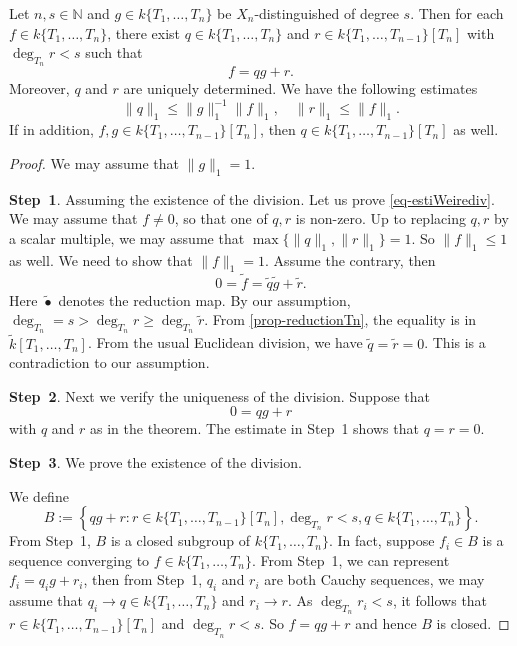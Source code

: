 \begin{thm}\label{thm-Weierstrassdivision}
    Let $n,s\in \mathbb{N}$ and $g\in k\{T_1,\ldots,T_n\}$ be $X_n$-distinguished of degree $s$. Then for each $f\in k\{T_1,\ldots,T_n\}$, there exist $q\in k\{T_1,\ldots,T_n\}$ and $r\in k\{T_1,\ldots,T_{n-1}\}[T_n]$ with $\deg_{T_n}r<s$ such that 
    \[
        f=qg+r.
    \]
    Moreover, $q$ and $r$ are uniquely determined. We have the following estimates
    \begin{equation}\label{eq-estiWeirediv}
        \|q\|_1\leq \|g\|_1^{-1}\|f\|_1,\quad \|r\|_1\leq \|f\|_1.   
    \end{equation}
    If in addition, $f,g\in k\{T_1,\ldots,T_{n-1}\}[T_n]$, then $q\in k\{T_1,\ldots,T_{n-1}\}[T_n]$ as well. 
\end{thm}
\begin{proof}
    We may assume that $\|g\|_1=1$.

    \textbf{Step~1}. Assuming the existence of the division. Let us prove \eqref{eq-estiWeirediv}. We may assume that $f\neq 0$, so that one of $q,r$ is non-zero. Up to replacing $q,r$ by a scalar multiple, we may assume that $\max\{\|q\|_1,\|r\|_1\}=1$. So $\|f\|_1\leq 1$ as well. We need to show that $\|f\|_1= 1$. Assume the contrary, then 
    \[
        0=\tilde{f} =\tilde{q}\tilde{g}+\tilde{r}. 
    \]
    Here $\tilde{\bullet}$ denotes the reduction map. By our assumption, $\deg_{T_n}=s>\deg_{T_n}r\geq \deg_{T_n}\tilde{r}$. From  \cref{prop-reductionTn}, the equality is in $\tilde{k}[T_1,\ldots,T_n]$. From the usual Euclidean division, we have $\tilde{q}=\tilde{r}=0$. This is a contradiction to our assumption.

    \textbf{Step~2}. Next we verify the uniqueness of the division. Suppose that 
    \[
        0=qg+r  
    \]
    with $q$ and $r$ as in the theorem. The estimate in Step~1 shows that $q=r=0$.

    \textbf{Step~3}. We prove the existence of the division.

    We define
    \[
        B:=\left\{qg+r:r\in k\{T_1,\ldots,T_{n-1}\}[T_n], \deg_{T_n}r<s,q\in k\{T_1,\ldots,T_{n}\}\right\}.
    \]
    From Step~1, $B$ is a closed subgroup of $k\{T_1,\ldots,T_{n}\}$. In fact, suppose $f_i\in B$ is a sequence converging to $f\in k\{T_1,\ldots,T_{n}\}$. From Step~1, we can represent $f_i=q_ig+r_i$, then from Step~1, $q_i$ and $r_i$ are both Cauchy sequences, we may assume that $q_i\to q\in k\{T_1,\ldots,T_{n}\}$ and $r_i\to r$. As $\deg_{T_n}r_i<s$, it follows that $r\in k\{T_1,\ldots,T_{n-1}\}[T_n]$ and $\deg_{T_n}r<s$. So $f=qg+r$ and hence $B$ is closed.


\end{proof}

